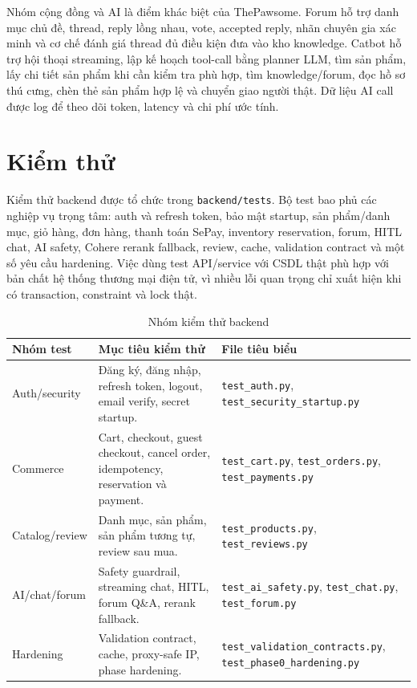 \documentclass[../DoAn.tex]{subfiles}
\begin{document}
Nhóm cộng đồng và AI là điểm khác biệt của ThePawsome. Forum hỗ trợ danh mục chủ đề, thread, reply lồng nhau, vote, accepted reply, nhãn chuyên gia xác minh và cơ chế đánh giá thread đủ điều kiện đưa vào kho knowledge. Catbot hỗ trợ hội thoại streaming, lập kế hoạch tool-call bằng planner LLM, tìm sản phẩm, lấy chi tiết sản phẩm khi cần kiểm tra phù hợp, tìm knowledge/forum, đọc hồ sơ thú cưng, chèn thẻ sản phẩm hợp lệ và chuyển giao người thật. Dữ liệu AI call được log để theo dõi token, latency và chi phí ước tính.

\section{Kiểm thử}
\label{section:4.4}

Kiểm thử backend được tổ chức trong \texttt{backend/tests}. Bộ test bao phủ các nghiệp vụ trọng tâm: auth và refresh token, bảo mật startup, sản phẩm/danh mục, giỏ hàng, đơn hàng, thanh toán SePay, inventory reservation, forum, HITL chat, AI safety, Cohere rerank fallback, review, cache, validation contract và một số yêu cầu hardening. Việc dùng test API/service với CSDL thật phù hợp với bản chất hệ thống thương mại điện tử, vì nhiều lỗi quan trọng chỉ xuất hiện khi có transaction, constraint và lock thật.

\begin{table}[H]
\centering
\small
\setlength{\tabcolsep}{3pt}
\renewcommand{\arraystretch}{1.2}
\caption{Nhóm kiểm thử backend}
\label{table:4.7}
\begin{tabular}{|>{\raggedright\arraybackslash}p{2.8cm}|>{\raggedright\arraybackslash}p{6.6cm}|>{\raggedright\arraybackslash}p{4.2cm}|}
\hline
\textbf{Nhóm test} & \textbf{Mục tiêu kiểm thử} & \textbf{File tiêu biểu} \\ \hline
Auth/security & Đăng ký, đăng nhập, refresh token, logout, email verify, secret startup. & \texttt{test\_auth.py}, \texttt{test\_security\_startup.py} \\ \hline
Commerce & Cart, checkout, guest checkout, cancel order, idempotency, reservation và payment. & \texttt{test\_cart.py}, \texttt{test\_orders.py}, \texttt{test\_payments.py} \\ \hline
Catalog/review & Danh mục, sản phẩm, sản phẩm tương tự, review sau mua. & \texttt{test\_products.py}, \texttt{test\_reviews.py} \\ \hline
AI/chat/forum & Safety guardrail, streaming chat, HITL, forum Q\&A, rerank fallback. & \texttt{test\_ai\_safety.py}, \texttt{test\_chat.py}, \texttt{test\_forum.py} \\ \hline
Hardening & Validation contract, cache, proxy-safe IP, phase hardening. & \texttt{test\_validation\_contracts.py}, \texttt{test\_phase0\_hardening.py} \\ \hline
\end{tabular}
\end{table}
\end{document}
